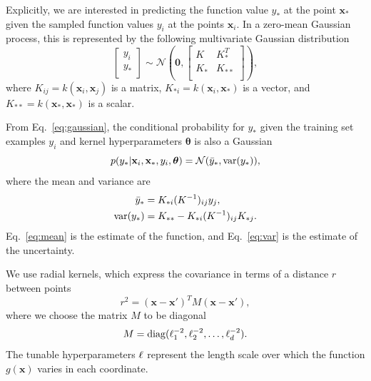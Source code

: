 \documentclass[prd,aps,letter,twocolumn,floatfix,notitlepage,nofootinbib]{revtex4-1}
\def\bx{\mathbf{x}}
\def\btheta{\boldsymbol{\theta}}
\begin{document}
Explicitly, we are interested in predicting the function value $y_*$ at the point $\bx_*$ given the sampled function values $y_i$ at the points $\bx_i$.  In a zero-mean Gaussian process, this is represented by the following multivariate Gaussian distribution
\begin{equation}
\label{eq:gaussian}
\begin{bmatrix}
y_i \\
y_* \\
\end{bmatrix}
\sim \mathcal{N}
\left({\bm 0}, 
\begin{bmatrix}
K & K_*^T \\
K_* & K_{**} \\
\end{bmatrix}
\right),
\end{equation}
where $K_{ij} = k(\bx_i, \bx_j)$ is a matrix, $K_{*i} = k(\bx_i, \bx_*)$ is a vector, and $K_{**} = k(\bx_*, \bx_*)$ is a scalar.

From Eq.~\eqref{eq:gaussian}, the conditional probability for $y_*$ given the training set examples $y_i$ and kernel hyperparameters $\btheta$ is also a Gaussian
\begin{equation}
p(y_* | \bx_i, \bx_*, y_i, \btheta) = \mathcal{N}(\bar y_*, {\rm var}(y_*)),
\end{equation}
where the mean and variance are
\begin{align}
\label{eq:mean}
\bar y_* &= K_{*i} (K^{-1})_{ij} y_j, \\
\label{eq:var}
{\rm var}(y_*) &= K_{**} - K_{*i} (K^{-1})_{ij} K_{*j}.
\end{align}
Eq.~\eqref{eq:mean} is the estimate of the function, and Eq.~\eqref{eq:var} is the estimate of the uncertainty.

We use radial kernels, which express the covariance in terms of a distance $r$ between points
\begin{equation}
r^2 = (\bx - \bx')^T M (\bx - \bx'),
\end{equation}
where we choose the matrix $M$ to be diagonal
\begin{equation}
M = {\rm diag}(\ell_1^{-2}, \ell_2^{-2}, \dots, \ell_d^{-2}).
\end{equation}
The tunable hyperparameters ${\bf \ell}$ represent the length scale over which the function $g(\bx)$ varies in each coordinate. 
\end{document}
